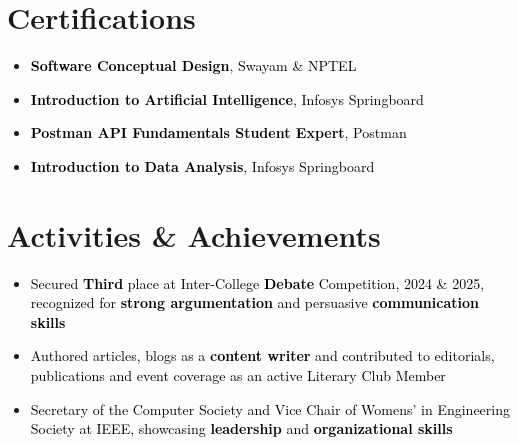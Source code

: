 \documentclass[a4paper,20pt]{article}
\begin{document}

\section{Certifications}
\vspace{5pt}
\begin{itemize}[label=\textbullet, labelsep=0.5em, left=0.5em, itemsep=-0.2em]
  \item \textcolor{black}{\textbf{Software Conceptual Design}, Swayam \& NPTEL}
  \item \textcolor{black}{\textbf{Introduction to Artificial Intelligence}, Infosys Springboard}
  \item \textcolor{black}{\textbf{Postman API Fundamentals Student Expert}, Postman}
  \item \textcolor{black}{\textbf{Introduction to Data Analysis}, Infosys Springboard}
\end{itemize}
\vspace{4pt}



\section{Activities \& Achievements}
\vspace{5pt}
\begin{itemize}[label=\textbullet, labelsep=0.5em, left=0.5em, itemsep=-0.2em]
  \item \textcolor{black}{Secured \textbf{Third} place at Inter-College \textbf{Debate} Competition, 2024 \& 2025, recognized for \textbf{strong argumentation} and persuasive \textbf{communication skills}}
  \item \textcolor{black}{Authored articles, blogs as a \textbf{content writer} and contributed to editorials, publications and event coverage as an active Literary Club Member}
  \item \textcolor{black}{Secretary of the Computer Society and Vice Chair of Womens' in Engineering Society at IEEE, showcasing \textbf{leadership} and \textbf{organizational skills}}
\end{itemize}
\end{document}
